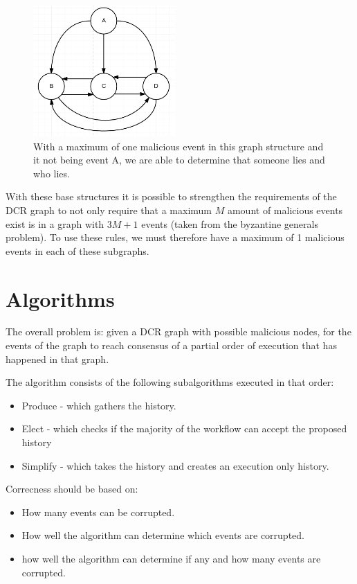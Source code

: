 \begin{figure}[H]
	\centering
	\includegraphics[height=5cm]{figures/GraphStructure_OneToThree}
	\caption{With a maximum of one malicious event in this graph structure and it not being event A, we are able to determine that someone lies and who lies.}
\end{figure}

\newpar With these base structures it is possible to strengthen the requirements of the DCR graph to not only require that a maximum $M$ amount of malicious events exist is in a graph with $3M+1$ events (taken from the byzantine generals problem). To use these rules, we must therefore have a maximum of 1 malicious events in each of these subgraphs.

\chapter{Algorithms}
The overall problem is: given a DCR graph with possible malicious nodes, for the events of the graph to reach consensus of a partial order of execution that has happened in that graph.

The algorithm consists of the following subalgorithms executed in that order:
\begin{itemize}
    \item Produce - which gathers the history.
    \item Elect - which checks if the majority of the workflow can accept the proposed history
    \item Simplify - which takes the history and creates an execution only history.
\end{itemize}

Correcness should be based on:
\begin{itemize}
    \item How many events can be corrupted.
    \item How well the algorithm can determine which events are corrupted.
    \item how well the algorithm can determine if any and how many events are corrupted.
\end{itemize}








